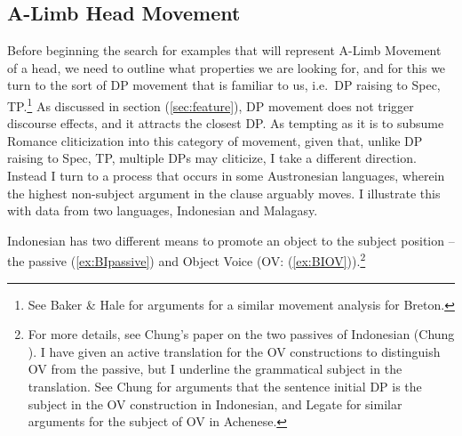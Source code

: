 \documentclass[output=paper,colorlinks,citecolor=brown,
]{langscibook}
\begin{document}
\subsection{A-Limb Head Movement}

Before beginning the search for examples that will represent A-Limb Movement of a head, we need to outline what properties we are looking for, and for this we turn to the sort of DP movement that is familiar to us, i.e.\ DP raising to Spec, TP.\footnote{See Baker \& Hale \citeyearpar{Baker:1990} for arguments for a similar movement analysis for Breton.}  As discussed in section (\ref{sec:feature}), DP movement does not trigger discourse effects, and it attracts the closest DP.  As tempting as it is to subsume Romance cliticization into this category of movement, given that, unlike DP raising to Spec, TP, multiple DPs may cliticize, I take a different direction. Instead I turn to a process that occurs in some Austronesian languages, wherein  the highest non-subject argument in the clause arguably moves.  I illustrate this with data from two languages, Indonesian and Malagasy.

Indonesian has two different means to promote an object to the subject position -- the passive (\ref{ex:BIpassive}) and Object Voice (OV: (\ref{ex:BIOV})).\footnote{For more details, see Chung's paper on the two passives of Indonesian (Chung \citeyear{Chung:1976a}). I have given an active translation for the OV constructions to distinguish OV from the passive, but I underline the grammatical subject in the translation.  See Chung \citeyearpar{Chung:1976a} for arguments that the sentence initial DP is the subject in the OV construction in Indonesian, and Legate \citeyearpar{Legate:2014} for similar arguments for the subject of OV in Achenese.}
\end{document}
